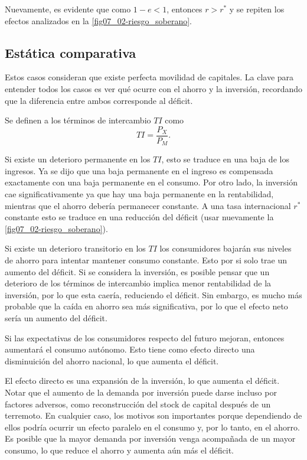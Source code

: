 \documentclass[DeGregorioResumen]{subfiles}
\begin{document}
Nuevamente, es evidente que como $1-e<1$, entonces $r>r^*$ y se repiten los efectos analizados en la \autoref{fig07_02-riesgo_soberano}.

\subsection{Estática comparativa}
Estos casos consideran que existe perfecta movilidad de capitales. La clave para entender todos los casos es ver qué ocurre con el ahorro y la inversión, recordando que la diferencia entre ambos corresponde al déficit.


Se definen a los términos de intercambio $TI$ como
\begin{equation*}
TI = \frac{P_X}{P_M}.
\end{equation*}

Si existe un deterioro permanente en los $TI$, esto se traduce en una baja de los ingresos. Ya se dijo que una baja permanente en el ingreso es compensada exactamente con una baja permanente en el consumo. Por otro lado, la inversión cae significativamente ya que hay una baja permanente en la rentabilidad, mientras que el ahorro debería permanecer constante. A una tasa internacional $r^*$ constante esto se traduce en una reducción del déficit (usar nuevamente la \autoref{fig07_02-riesgo_soberano}).

Si existe un deterioro transitorio en los $TI$ los consumidores bajarán sus niveles de ahorro para intentar mantener consumo constante. Esto por si solo trae un aumento del déficit. Si se considera la inversión, es posible pensar que un deterioro de los términos de intercambio implica menor rentabilidad de la inversión, por lo que esta caería, reduciendo el déficit. Sin embargo, es mucho más probable que la caída en ahorro sea más significativa, por lo que el efecto neto sería un aumento del déficit.


Si las expectativas de los consumidores respecto del futuro mejoran, entonces aumentará el consumo autónomo. Esto tiene como efecto directo una disminuición del ahorro nacional, lo que aumenta el déficit.


El efecto directo es una expansión de la inversión, lo que aumenta el déficit. Notar que el aumento de la demanda por inversión puede darse incluso por factores adversos, como reconstrucción del stock de capital después de un terremoto. En cualquier caso, los motivos son importantes porque dependiendo de ellos podría ocurrir un efecto paralelo en el consumo y, por lo tanto, en el ahorro. Es posible que la mayor demanda por inversión venga acompañada de un mayor consumo, lo que reduce el ahorro y aumenta aún más el déficit.
\end{document}
